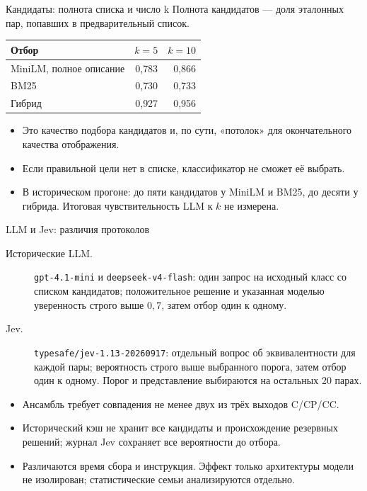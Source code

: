 \documentclass[aspectratio=169,11pt]{beamer}
\begin{document}
\renewcommand{\hseheadertext}{Дополнительные материалы}
\begin{frame}{Кандидаты: полнота списка и число k}
  Полнота кандидатов --- доля эталонных пар, попавших в предварительный список.
  \medskip
  \begin{tabular}{@{}lrr@{}}
    \toprule
    Отбор & $k=5$ & $k=10$ \\
    \midrule
    MiniLM, полное описание & 0{,}783 & 0{,}866 \\
    BM25 & 0{,}730 & 0{,}733 \\
    Гибрид & 0{,}927 & 0{,}956 \\
    \bottomrule
  \end{tabular}
  \begin{itemize}
    \item Это качество подбора кандидатов и, по сути, «потолок» для окончательного качества отображения.
    \item Если правильной цели нет в списке, классификатор не сможет её выбрать.
    \item В историческом прогоне: до пяти кандидатов у MiniLM и BM25,
      до десяти у гибрида. Итоговая чувствительность LLM к $k$ не измерена.
  \end{itemize}
\end{frame}

\renewcommand{\hseheadertext}{Дополнительные материалы}
\begin{frame}{LLM и Jev: различия протоколов}
  \begin{description}
    \item[Исторические LLM.] \texttt{gpt-4.1-mini} и \texttt{deepseek-v4-flash}:
      один запрос на исходный класс со списком кандидатов;
      положительное решение и указанная моделью уверенность строго выше $0{,}7$, затем отбор один к одному.
    \item[Jev.] \texttt{typesafe/jev-1.13-20260917}:
      отдельный вопрос об эквивалентности для каждой пары;
      вероятность строго выше выбранного порога, затем отбор один к одному.
      Порог и представление выбираются на остальных 20 парах.
  \end{description}
  \begin{itemize}
    \item Ансамбль требует совпадения не менее двух из трёх выходов C/CP/CC.
    \item Исторический кэш не хранит все кандидаты и происхождение резервных решений; журнал Jev сохраняет все вероятности до отбора.
    \item Различаются время сбора и инструкция. Эффект только архитектуры модели не изолирован; статистические семьи анализируются отдельно.
  \end{itemize}
\end{frame}
\end{document}
